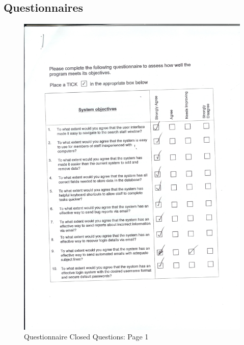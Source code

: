 \subsection{Questionnaires}\label{qs}

\begin{figure}[H]
    \includegraphics[width=\textwidth]{./Evaluation/EvaluationQuestionnaire/Scan9.jpeg}
    \caption{Questionnaire Closed Questions: Page 1} 
\end{figure}


